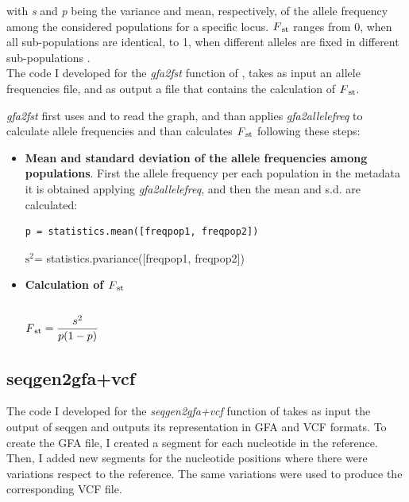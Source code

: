 with \emph{s} and \emph{p} being the variance and mean, respectively, of the allele frequency among the considered populations for a specific locus. $F\textsubscript{st}$  ranges from 0, when all sub-populations are identical, to 1, when different alleles are fixed in different sub-populations \cite{barbujani2010human}.\\

The code I developed for the \textit{gfa2fst} function of \vgp, takes as input an allele frequencies file, and as output a file that contains the calculation of $F\textsubscript{st}$.

\textit{gfa2fst} first uses \bbp and \bbc to read the graph, and than applies \textit{gfa2allelefreq} to calculate allele frequencies and than calculates $F\textsubscript{st}$ following these steps: 

\begin{itemize}
\item\textbf{Mean and standard deviation of the allele frequencies among populations}. First the allele frequency per each population in the metadata it is obtained applying \textit{gfa2allelefreq}, and then the mean and s.d. are calculated:  
\begin{verbatim}
p = statistics.mean([freqpop1, freqpop2])
\end{verbatim}
$\mathrm{s}^{2}$= statistics.pvariance([freqpop1, freqpop2])
\item\textbf{Calculation of $F\textsubscript{st}$}
\begin{verbatim}
\end{verbatim}
$F\textsubscript{st} = \dfrac{s^{2}}{p(1-p)}$
\end{itemize}



\subsection{seqgen2gfa+vcf}
The code I developed for the \textit{seqgen2gfa+vcf} function of \vgp takes as input the output of seqgen and outputs its representation in GFA and VCF formats. To create the GFA file, I created a segment for each nucleotide in the reference. Then, I added new segments for the nucleotide positions where there were variations respect to the reference. The same variations were used to produce the corresponding VCF file.

\newpage

